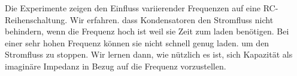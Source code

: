 %
%
Die Experimente zeigen den Einfluss variierender Frequenzen auf eine RC-Reihenschaltung. Wir erfahren. dass Kondensatoren
den Stromfluss nicht behindern, wenn die Frequenz hoch ist weil sie Zeit zum laden benötigen. Bei einer sehr hohen Frequenz
können sie nicht schnell genug laden. um den Stromfluss zu stoppen. Wir lernen dann, wie nützlich es ist, sich Kapazität als
imaginäre Impedanz in Bezug auf die Frequenz vorzustellen.
%
%
%
\begin{flushright}
  \textit{\autorA}
\end{flushright}
%
%
%
%